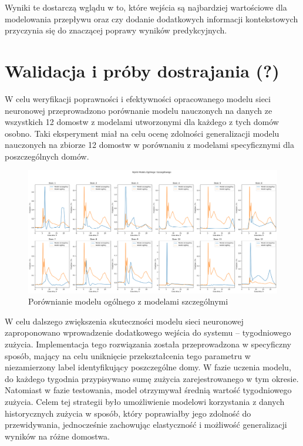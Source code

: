 \documentclass[a4paper,twoside,12pt]{book}
\begin{document}
Wyniki te dostarczą wglądu w to, które wejścia są najbardziej wartościowe dla modelowania przepływu oraz czy dodanie dodatkowych informacji kontekstowych przyczynia się do znaczącej poprawy wyników predykcyjnych.
\newpage

\section{Walidacja i próby dostrajania (?)}
W celu weryfikacji poprawności i efektywności opracowanego modelu sieci neuronowej przeprowadzono porównanie modelu nauczonych na danych ze wszystkich 12 domostw z modelami utworzonymi dla każdego z tych domów osobno. Taki eksperyment miał na celu ocenę zdolności generalizacji modelu nauczonych na zbiorze 12 domostw w porównaniu z modelami specyficznymi dla poszczególnych domów.

\begin{figure}[!h]
  \centering
  \includegraphics[width=1\textwidth]{img/szczegółowy_ogolny_porówniaie.png}
  \caption{Porównianie modelu ogólnego z modelami szczególnymi}
  \label{fig:etykieta-rysunku}
\end{figure}

W celu dalszego zwiększenia skuteczności modelu sieci neuronowej zaproponowano wprowadzenie dodatkowego wejścia do systemu – tygodniowego zużycia. Implementacja tego rozwiązania została przeprowadzona w specyficzny sposób, mający na celu uniknięcie przekształcenia tego parametru w niezamierzony label identyfikujący poszczególne domy. W fazie uczenia modelu, do każdego tygodnia przypisywano sumę zużycia zarejestrowanego w tym okresie. Natomiast w fazie testowania, model otrzymywał średnią wartość tygodniowego zużycia. Celem tej strategii było umożliwienie modelowi korzystania z danych historycznych zużycia w sposób, który poprawiałby jego zdolność do przewidywania, jednocześnie zachowując elastyczność i możliwość generalizacji wyników na różne domostwa.
\end{document}
